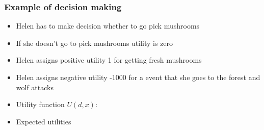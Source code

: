 \documentclass[10pt]{beamer}
\begin{document}
\begin{frame}

\frametitle{Example of decision making}

  \begin{itemize}
  \item<+-> Helen has to make decision whether to go pick mushrooms
  \item<+-> If she doesn't go to pick mushrooms utility is zero
  \item<+-> Helen assigns positive utility 1 for getting fresh mushrooms
  \item<+-> Helen assigns negative utility -1000 for a event that she goes to the forest and wolf attacks\\
  \item Utility function $U(d,x)$:

    \item Expected utilities\\
  \end{itemize}

\end{frame}
\end{document}
